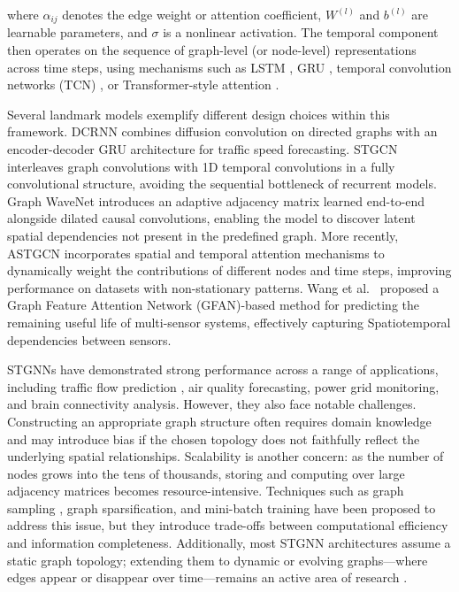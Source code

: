 \documentclass[acmsmall]{acmart}
\begin{document}
where $\alpha_{ij}$ denotes the edge weight or attention coefficient, $W^{(l)}$ and $b^{(l)}$ are learnable parameters, and $\sigma$ is a nonlinear activation. The temporal component then operates on the sequence of graph-level (or node-level) representations across time steps, using mechanisms such as LSTM \cite{rnn_lstm}, GRU \cite{cho2014gru}, temporal convolution networks (TCN) \cite{lea2017temporal}, or Transformer-style attention \cite{vaswani2017attention}.
 
Several landmark models exemplify different design choices within this framework. DCRNN \cite{li2018dcrnn} combines diffusion convolution on directed graphs with an encoder-decoder GRU architecture for traffic speed forecasting. STGCN \cite{yu2018spatio} interleaves graph convolutions with 1D temporal convolutions in a fully convolutional structure, avoiding the sequential bottleneck of recurrent models. Graph WaveNet \cite{wu2019graphwavenet} introduces an adaptive adjacency matrix learned end-to-end alongside dilated causal convolutions, enabling the model to discover latent spatial dependencies not present in the predefined graph. More recently, ASTGCN \cite{guo2019astgcn} incorporates spatial and temporal attention mechanisms to dynamically weight the contributions of different nodes and time steps, improving performance on datasets with non-stationary patterns. Wang et al.~\cite{wang2025rul} proposed a Graph Feature Attention Network (GFAN)-based method for predicting the remaining useful life of multi-sensor systems, effectively capturing Spatiotemporal dependencies between sensors.
 
STGNNs have demonstrated strong performance across a range of applications, including traffic flow prediction \cite{yu2018spatio, li2018dcrnn}, air quality forecasting, power grid monitoring, and brain connectivity analysis. However, they also face notable challenges. Constructing an appropriate graph structure often requires domain knowledge and may introduce bias if the chosen topology does not faithfully reflect the underlying spatial relationships. Scalability is another concern: as the number of nodes grows into the tens of thousands, storing and computing over large adjacency matrices becomes resource-intensive. Techniques such as graph sampling \cite{hamilton2017inductive}, graph sparsification, and mini-batch training have been proposed to address this issue, but they introduce trade-offs between computational efficiency and information completeness. Additionally, most STGNN architectures assume a static graph topology; extending them to dynamic or evolving graphs—where edges appear or disappear over time—remains an active area of research \cite{pareja2020evolvegcn}.
 
\end{document}
